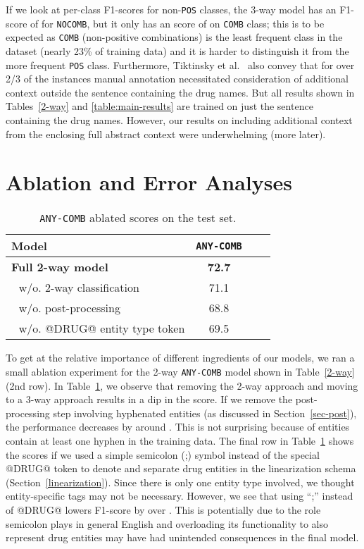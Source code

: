 \documentclass[conference]{IEEEtran}
\begin{document}
If we look at per-class F1-scores for non-\texttt{POS} classes, the 3-way model has an F1-score of  for \texttt{NOCOMB}, but it only has an  score of  on \texttt{COMB} class; this is to be expected as \texttt{COMB} (non-positive combinations) is the least frequent class in the dataset (nearly 23\% of training data) and it is harder to distinguish it from the more frequent \texttt{POS} class.  Furthermore, Tiktinsky et al.~\cite{tiktinsky-etal-2022-dataset} also convey that for over 2/3 of the instances manual annotation necessitated consideration of additional context outside the sentence containing the drug names. But all results shown in Tables~\ref{2-way} and \ref{table:main-results} are trained on just the sentence containing the drug names. However, our results on including additional context from the enclosing full abstract context were underwhelming (more later). 

\section{Ablation and Error Analyses}
\label{sec-error}
\begin{table}[h]
\centering
 \renewcommand{\arraystretch}{1.2}
 \caption{\texttt{ANY-COMB} ablated  scores on the test set.}
\label{tb:ablation}
\begin{tabular}{lccc}
\toprule
\textbf{Model} & \texttt{ANY-COMB}  \\\midrule
\textbf{Full 2-way model}  & \textbf{72.7} \\
 \,\, w/o. 2-way classification   & 71.1 \\
 \,\, w/o. post-processing & 68.8 \\
  \,\, w/o. @DRUG@ entity type token & 69.5 \\
\bottomrule
\end{tabular}


\end{table}
To get at the relative importance of different ingredients of our models, we ran a small ablation experiment for the 2-way \texttt{ANY-COMB} model shown in Table~\ref{2-way} (2nd row). 
In Table~\ref{tb:ablation}, we observe that removing the 2-way approach and moving to a 3-way approach results in a  dip in the score. If we remove the post-processing step involving hyphenated entities (as discussed in Section~\ref{sec-post}), the performance decreases by around . This is not surprising because  of entities contain at least one hyphen in the training data. The final row in Table~\ref{tb:ablation} shows the scores if we used a simple semicolon (;) symbol instead of the special @DRUG@ token to denote and separate drug entities in the linearization schema (Section~\ref{linearization}). Since there is only one entity type involved, we thought entity-specific tags may not be necessary. However, we see that using ``;'' instead of @DRUG@ lowers F1-score by over . This is potentially due to the role semicolon plays in general English and overloading its functionality to also represent drug entities may have had unintended consequences in the final model.
\end{document}
